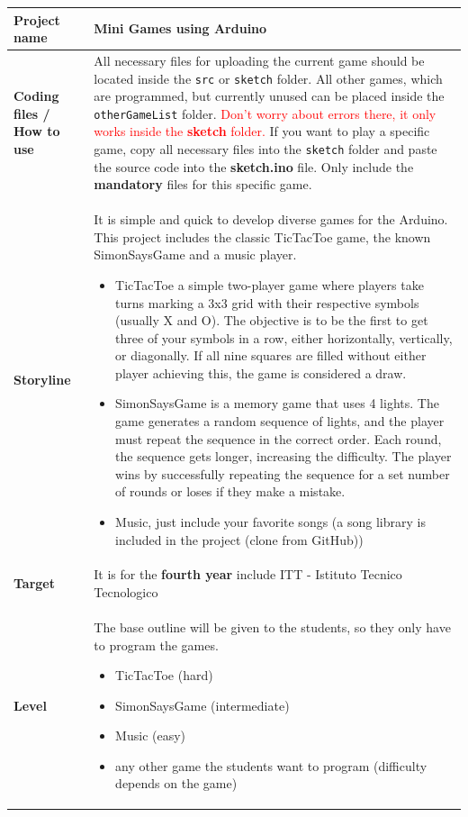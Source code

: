 \documentclass[10pt]{article}
\begin{document}
\begin{longtable}{|p{3.5cm}|p{11cm}|}
  \hline
  \textbf{Project name} & \textbf{Mini Games} using Arduino  \\ \hline
  
  \textbf{Coding files / How to use} & All necessary files for uploading the current game should be located inside the \texttt{src} or \texttt{sketch} folder. All other games, which are programmed, but currently unused can be placed inside the \texttt{otherGameList} folder. \textcolor{red}{Don't worry about errors there, it only works inside the \textbf{sketch} folder.} If you want to play a specific game, copy all necessary files into the \texttt{sketch} folder and paste the source code into the \textbf{sketch.ino} file. Only include the  \textbf{mandatory} files for this specific game. \\ \hline
  
  \textbf{Storyline} & It is simple and quick to develop diverse games for the Arduino. This project includes the classic TicTacToe game, the known SimonSaysGame and a music player. 
  \begin{itemize}
    \item TicTacToe a simple two-player game where players take turns marking a 3x3 grid with their respective symbols (usually X and O). The objective is to be the first to get three of your symbols in a row, either horizontally, vertically, or diagonally. If all nine squares are filled without either player achieving this, the game is considered a draw.
    \item SimonSaysGame is a memory game that uses 4 lights. The game generates a random sequence of lights, and the player must repeat the sequence in the correct order. Each round, the sequence gets longer, increasing the difficulty. The player wins by successfully repeating the sequence for a set number of rounds or loses if they make a mistake.
    \item Music, just include your favorite songs (a song library is included in the project (clone from GitHub))
  \end{itemize}\\ \hline
  
  \textbf{Target} & It is for the \textbf{fourth year} include ITT - Istituto Tecnico Tecnologico \\ \hline
  
  \textbf{Level} & 
  The base outline will be given to the students, so they only have to program the games.
  \begin{itemize}
    \item TicTacToe (hard)
    \item SimonSaysGame (intermediate)
    \item Music (easy)
    \item any other game the students want to program (difficulty depends on the game)
  \end{itemize} \\ \hline
  

\end{longtable}
\end{document}
